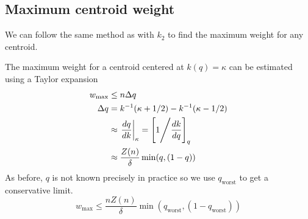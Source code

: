 \documentclass[11pt]{amsart}
\begin{document}
\subsection{Maximum centroid weight}
We can follow the same method as with $k_2$ to find the maximum weight for any centroid.

The maximum weight for a centroid centered at $k(q) = \kappa$ can be estimated using a Taylor expansion
\[
\begin{aligned}
w_{\max} &\le n \Delta q \\
\Delta q &= k^{-1}(\kappa + 1/2) - k^{-1}(\kappa-1/2) \\
&\approx \left . \frac {dq} {dk} \right\rvert_{\kappa} = \left[ 1 \Bigg \slash {\frac {dk} {dq}} \right]_q\\
&\approx \frac {Z(n)} \delta \min (q, (1-q)) \\
\end{aligned}
\]
As before, $q$ is not known precisely in practice so we use $q_{\text {worst}}$ to get a conservative limit.
\[
w_{\max}\le \frac {nZ(n)} \delta \min (q_{\text{worst}}, (1-q_{\text{worst}})) 
\]
\end{document}
